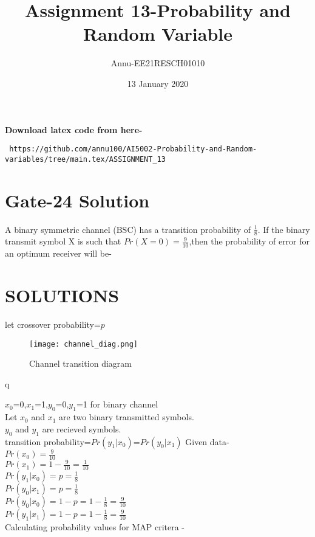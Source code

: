 \documentclass[journel,12pt,twocoloums]{IEEEtran}
\title{Assignment 13-Probability and Random Variable}
\author{Annu-EE21RESCH01010}
\date{13 January 2020}
\begin{document}
 \maketitle
\textbf{Download latex code from here-}\\
\begin{lstlisting}
 https://github.com/annu100/AI5002-Probability-and-Random-variables/tree/main.tex/ASSIGNMENT_13
 \end{lstlisting}

 \section{Gate-24 Solution}

A binary symmetric channel (BSC) has a transition
probability of $\frac{1}{8}$. If the binary transmit
symbol X is such that $Pr(X=0)=\frac{9}{10}$,then
the probability of error for an optimum receiver
will be-

\section{SOLUTIONS}
let crossover probability=$p$\\
\begin{figure}[h!]
    \centering
    \texttt{[image: channel\_diag.png]}
    \caption{Channel transition diagram}
    \label{fig:Channel transition diagram}
\end{figure}q
\begin{flushleft}
$x_0$=0,$x_1$=1,$y_0$=0,$y_1$=1 for binary channel\\
Let $x_0$ and $x_1$ are two binary transmitted symbols.\\
$y_0$ and $y_1$ are recieved symbols.\\
transition probability=$Pr(y_1|x_0)$=$Pr(y_0|x_1)$
Given data-\\
$Pr(x_0)=\frac{9}{10}$\\
$Pr(x_1)=1-\frac{9}{10}=\frac{1}{10}$\\
$Pr(y_1|x_0)=p=\frac{1}{8}$\\
$Pr(y_0|x_1)=p=\frac{1}{8}$\\
$Pr(y_0|x_0)=1-p=1-\frac{1}{8}=\frac{9}{10}$\\
$Pr(y_1|x_1)=1-p=1-\frac{1}{8}=\frac{9}{10}$\\
Calculating probability values for MAP critera -
\end{flushleft}
\end{document}
